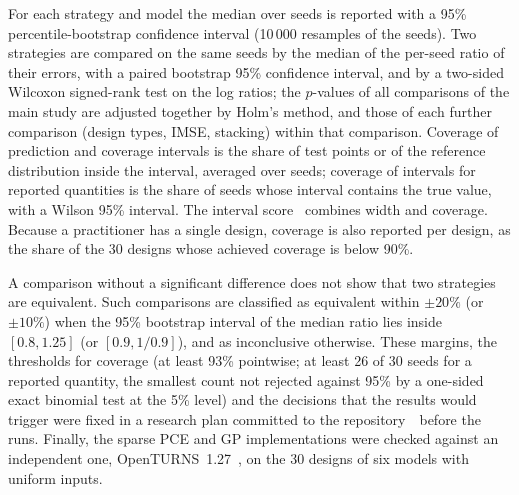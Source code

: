 For each strategy and model the median over seeds is reported with a 95\%
percentile-bootstrap confidence interval (10\,000 resamples of the seeds).
Two strategies are compared on the same seeds by the median of the per-seed
ratio of their errors, with a paired bootstrap 95\% confidence interval,
and by a two-sided Wilcoxon signed-rank test on the log ratios; the
$p$-values of all comparisons of the main study are adjusted together by
Holm's method, and those of each further comparison (design types, IMSE,
stacking) within that comparison. Coverage of prediction and coverage intervals is the share of test
points or of the reference distribution inside the interval, averaged over
seeds; coverage of intervals for reported quantities is the share of seeds
whose interval contains the true value, with a Wilson 95\% interval. The
interval score~\cite{gneiting2007} combines width and coverage. Because a
practitioner has a single design, coverage is also reported per design, as
the share of the 30 designs whose achieved coverage is below 90\%.

A comparison without a significant difference does not show that two
strategies are equivalent. Such comparisons are classified as equivalent
within $\pm20\%$ (or $\pm10\%$) when the 95\% bootstrap interval of the median
ratio lies inside $[0.8,1.25]$ (or $[0.9,1/0.9]$), and as inconclusive
otherwise. These margins, the thresholds for coverage (at least 93\%
pointwise; at least 26 of 30 seeds for a reported quantity, the smallest
count not rejected against 95\% by a one-sided exact binomial test at the
5\% level) and the decisions that the results would trigger were fixed in a
research plan committed to the repository~\repocite\ before the runs.
Finally, the sparse PCE and GP implementations were checked against an
independent one, OpenTURNS~1.27~\cite{baudin2017}, on the 30 designs of six
models with uniform inputs.
